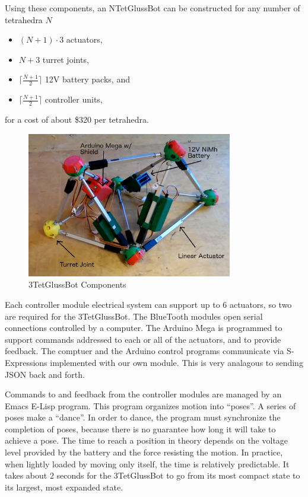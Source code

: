 \documentclass[11pt]{article}
\begin{document}
Using these components, an NTetGlussBot can be constructed for any number of tetrahedra $N$

\begin{itemize}  
\item $(N + 1)\cdot 3$  actuators,
\item $N+3$ turret joints,
\item $\lceil \frac{N + 1}{2} \rceil$ 12V battery packs, and
\item $\lceil \frac{N + 1}{2} \rceil$ controller units,
\end{itemize}
for a cost of about \$320 per tetrahedra.

\begin{figure}[!ht]
  \centering
    \includegraphics[width=0.8\textwidth]{3TetGlussBotPhotoAnnotated.png}
    \caption[3TetGlussBot Components]{3TetGlussBot Components}
      \label{annotated}
\end{figure}


Each controller module electrical system can support up to 6 actuators, so two are required for the 3TetGlussBot.
The BlueTooth modules open serial connections controlled by a computer.
The Arduino Mega is programmed to support commands addressed to each or all of the actuators, and
to provide feedback. The comptuer and the Arduino control programs communicate via S-Expressions
implemented with our own module. This is very analagous to sending JSON back and forth.

Commands to and feedback from the controller modules are managed by an Emacs E-Lisp program.
This program organizes motion into ``poses''. A series of poses make a ``dance''.
In order to dance, the program must synchronize the completion of poses, because there is no
guarantee how long it will take to achieve a pose. The time to reach a position in theory
depends on the voltage level provided by the battery and the force resisting the motion.
In practice, when lightly loaded by moving only itself, the time is relatively predictable. It takes
about 2 seconds for the 3TetGlussBot to go from its most compact state to its largest, most expanded state.
\end{document}
